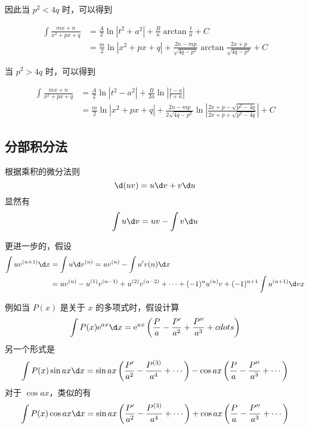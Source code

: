 因此当 $p^2<4q$ 时，可以得到

\begin{equation*}
    \begin{aligned}
        \int \frac{mx+n}{x^2+px+q} & = \frac{A}{2} \ln|t^2 + a^2| + \frac{B}{a}\arctan\frac{t}{a} + C                               \\
                                   & =\frac{m}{2}\ln|x^2+px+q| + \frac{2n-mp}{\sqrt{4q-p^2}}\arctan{\frac{2x+p}{\sqrt{4q-p^2}}} + C
    \end{aligned}
\end{equation*}

当 $p^2>4q$ 时，可以得到

\begin{equation*}
    \begin{aligned}
        \int \frac{mx+n}{x^2+px+q} & = \frac{A}{2} \ln|t^2 - a^2| + \frac{B}{2a}\ln\left|\frac{t-a}{t+a}\right|                                                  \\
                                   & =\frac{m}{2}\ln|x^2+px+q| + \frac{2n-mp}{2\sqrt{4q-p^2}}\ln\left| \frac{2x+p-\sqrt{p^2-4q}}{2x+p+\sqrt{p^2-4q}} \right| + C
    \end{aligned}
\end{equation*}

\subsection{分部积分法}

根据乘积的微分法则
\[ \d(uv) = u \d v + v \d u \]
显然有
\[ \int u \d v = uv - \int v \d u \]

更进一步的，假设
\[ \begin{aligned}
        \int u v^{(n+1)} \d x & = \int u \d v^{(n)} = uv^{(n)} - \int u' v(n) \d x                                                                 \\
                              & = u v^{(n)} - u^{(1)} v^{(n-1)} + u^{(2)} v^{(n-2)} + \cdots + (-1)^n u^{(n)} v + (-1)^{n+1} \int u^{(n+1)} \d v x
    \end{aligned} \]

例如当 $P(x)$ 是关于 $x$ 的多项式时，假设计算
\[ \int P(x) \ee^{ax} \d x = \ee^{ax} \left( \frac{P}{a} - \frac{P'}{a^2} + \frac{P''}{a^3} + cdots \right) \]
另一个形式是
\[ \int P(x) \sin ax \d x = \sin ax \left( \frac{P'}{a^2} - \frac{P^{(3)}}{a^4} + \cdots  \right) - \cos ax \left( \frac{P}{a} - \frac{P''}{a^3} + \cdots \right) \]
对于 $\cos ax$，类似的有
\[ \int P(x) \cos ax \d x = \sin ax \left( \frac{P'}{a^2} - \frac{P^{(3)}}{a^4} + \cdots  \right) + \cos ax \left( \frac{P}{a} - \frac{P''}{a^3} + \cdots \right) \]


